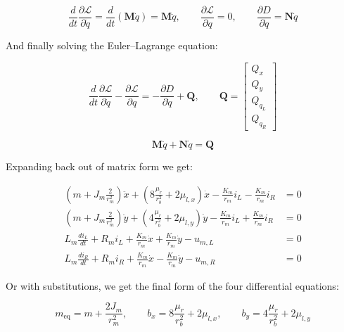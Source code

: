 \begin{equation*}
\frac{d}{dt}\frac{\partial \mathcal{L}}{\partial \dot q} = \frac{d}{dt}\left(\mathbf{M}\dot q\right) = \mathbf{M}\ddot q, \qquad
\frac{\partial \mathcal{L}}{\partial q} = 0, \qquad
\frac{\partial D}{\partial \dot q} = \mathbf{N}\dot q
\end{equation*}

And finally solving the Euler--Lagrange equation:

\begin{equation*}
\frac{d}{dt}\frac{\partial \mathcal{L}}{\partial \dot q} - \frac{\partial \mathcal{L}}{\partial q} = -\frac{\partial D}{\partial \dot q} + \mathbf{Q},
\qquad
\mathbf{Q} = \begin{bmatrix} Q_x \\ Q_y \\ Q_{q_L} \\ Q_{q_R} \end{bmatrix}
\end{equation*}

\begin{equation}
\label{eq:lagrange_matrix}
\mathbf{M}\ddot q + \mathbf{N}\dot q = \mathbf{Q}
\end{equation}

Expanding back out of matrix form we get:


\begin{equation*}
\begin{aligned}
\left(m + J_m\frac{2}{r_m^2}\right)\ddot x
  + \left(8\frac{\mu_r}{r_b^2} + 2\mu_{l,x}\right)\dot x
  - \frac{K_m}{r_m} i_L - \frac{K_m}{r_m} i_R &= 0 \\
\left(m + J_m\frac{2}{r_m^2}\right)\ddot y
  + \left(4\frac{\mu_r}{r_b^2} + 2\mu_{l,y}\right)\dot y
  - \frac{K_m}{r_m} i_L + \frac{K_m}{r_m} i_R &= 0 \\
L_m \frac{di_L}{dt} + R_m i_L + \frac{K_m}{r_m}\dot x + \frac{K_m}{r_m}\dot y - u_{m,L} &= 0 \\
L_m \frac{di_R}{dt} + R_m i_R + \frac{K_m}{r_m}\dot x - \frac{K_m}{r_m}\dot y - u_{m,R} &= 0
\end{aligned}
\end{equation*}

Or with substitutions, we get the final form of the four differential equations:

\begin{equation*}
m_{\mathrm{eq}} = m + \frac{2J_m}{r_m^2},
\qquad
b_x = 8\frac{\mu_r}{r_b^2} + 2\mu_{l,x},
\qquad
b_y = 4\frac{\mu_r}{r_b^2} + 2\mu_{l,y}
\end{equation*}

